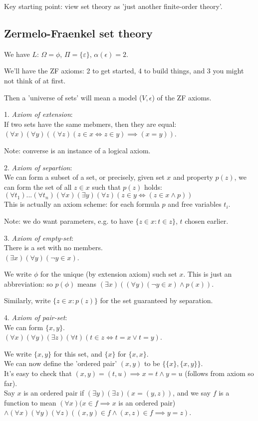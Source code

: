 \documentclass[a4paper]{article}
\begin{document}
Key starting point: view set theory as 'just another finite-order theory'.

\subsection{Zermelo-Fraenkel set theory}
We have $L$: $\Omega = \phi$, $\Pi = \{\varepsilon\}$, $\alpha(\epsilon) = 2$.

We'll have the ZF axioms: 2 to get started, 4 to build things, and 3 you might not think of at first.

Then a 'universe of sets' will mean a model ($V,\epsilon$) of the ZF axioms.

1. \emph{Axiom of extension}:\\
If two sets have the same mebmers, then they are equal:\\
$(\forall x)(\forall y) ((\forall z) (z \in x \iff z \in y) \implies (x=y))$.

Note: converse is an instance of a logical axiom.

2. \emph{Axiom of separtion}:\\
We can form a subset of a set, or precisely, given set $x$ and property $p(z)$, we can form the set of all $z \in x$ such that $p(z)$ holds:\\
$(\forall t_1) ... (\forall t_n) (\forall x)(\exists y) (\forall z) (z \in y \iff (z \in x \wedge p))$\\
This is actually an axiom scheme: for each formula $p$ and free variables $t_i$.

Note: we do want parameters, e.g. to have $\{z \in x: t \in z\}$, $t$ chosen earlier.

3. \emph{Axiom of empty-set}:\\
There is a set with no members.\\
$(\exists x) (\forall y) (\neg y \in x)$.

We write $\phi$ for the unique (by extension axiom) such set $x$. This is just an abbreviation: so $p(\phi)$ means $(\exists x) ((\forall y) (\neg y \in x) \wedge p(x))$.

Similarly, write $\{z \in x: p (z)\}$ for the set guaranteed by separation.

4. \emph{Axiom of pair-set}:\\
We can form $\{x,y\}$.\\
$(\forall x)(\forall y)(\exists z) (\forall t) (t \in z \iff t = x \vee t = y)$.

We write $\{x,y\}$ for this set, and $\{x\}$ for $\{x,x\}$.\\
We can now define the 'ordered pair' $(x,y)$ to be $\{\{x\},\{x,y\}\}$.\\
It's easy to check that $(x,y) = (t,u) \implies x=t \wedge y=u$ (follows from axiom so far).\\
Say $x$ is an ordered pair if $(\exists y) (\exists z) (x=(y,z))$, and we say $f$ is a function to mean $(\forall x) (x \in f \implies x$ is an ordered pair) $\wedge (\forall x)(\forall y)(\forall z)((x,y) \in f \wedge (x,z) \in f \implies y=z)$.
\end{document}
